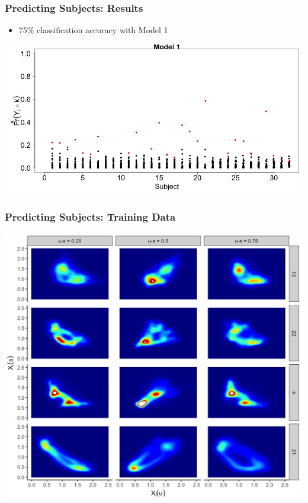 \documentclass[10pt]{beamer}\usepackage[]{graphicx}\usepackage[]{color}
\begin{document}
\begin{frame}
\frametitle{Predicting Subjects: Results}
\begin{itemize}
\item 75\% classification accuracy with Model 1
\end{itemize}
\centering
\includegraphics[width=\textwidth]{pred_subjs_m1.jpeg}
\end{frame}

\begin{frame}
\frametitle{Predicting Subjects: Training Data}
\centering
\includegraphics[height=\textheight]{kde_2d_fits_train.jpeg}
\end{frame}
\end{document}
